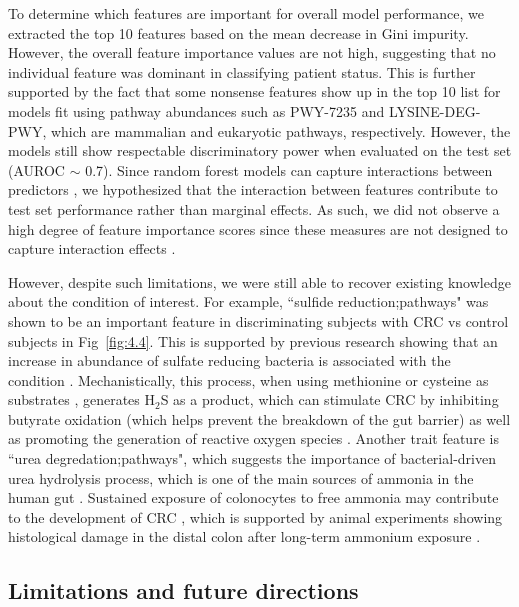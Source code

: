 To determine which features are important for overall model performance, we extracted the top 10 features based on the mean decrease in Gini impurity. However, the overall feature importance values are not high, suggesting that no individual feature was dominant in classifying patient status. This is further supported by the fact that some nonsense features show up in the top 10 list for models fit using pathway abundances such as PWY-7235 and LYSINE-DEG-PWY, which are mammalian and eukaryotic pathways, respectively. However, the models still show respectable discriminatory power when evaluated on the test set (AUROC $\sim$ 0.7). Since random forest models can capture interactions between predictors \cite{hastie2009elements}, we hypothesized that the interaction between features contribute to test set performance rather than marginal effects. As such, we did not observe a high degree of feature importance scores since these measures are not designed to capture interaction effects \cite{wright2016little}. 

However, despite such limitations, we were still able to recover existing knowledge about the condition of interest. For example, ``sulfide reduction;pathways" was shown to be an important feature in discriminating subjects with CRC vs control subjects in Fig~\ref{fig:4.4}. This is supported by previous research showing that an increase in abundance of sulfate reducing bacteria is associated with the condition \cite{yachida2019metagenomic}. Mechanistically, this process, when using methionine or cysteine as substrates \cite{cheng2020intestinal}, generates H$_2$S as a product, which can stimulate CRC by inhibiting butyrate oxidation (which helps prevent the breakdown of the gut barrier) as well as promoting the generation of reactive oxygen species \cite{marquet2009lactate}. Another trait feature is ``urea degredation;pathways", which suggests the importance of bacterial-driven urea hydrolysis process, which is one of the main sources of ammonia in the human gut \cite{blachier2007effects}. Sustained exposure of colonocytes to free ammonia may contribute to the development of CRC \cite{clausen1992fecal}, which is supported by animal experiments showing histological damage in the distal colon after long-term ammonium exposure \cite{lin1991colon}.      
\subsection{Limitations and future directions}

